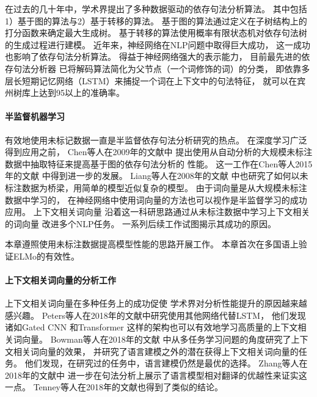 在过去的几十年中，学术界提出了多种数据驱动的依存句法分析算法。
其中包括1）基于图的算法\cite{mcdonald2006online}与2）基于转移的算法\cite{nivre2008algorithms,dyer-EtAl:2015:ACL-IJCNLP,zhang-nivre:2011:ACL-HLT2011}。
基于图的算法通过定义在子树结构上的打分函数来确定最大生成树。
基于转移的算法使用概率有限状态机对依存句法树的生成过程进行建模。
近年来，神经网络在NLP问题中取得巨大成功，
这一成功也影响了依存句法分析算法。
得益于神经网络强大的表示能力，
目前最先进的依存句法分析器\cite{DBLP:journals/corr/DozatM16,dozat-qi-manning:2017:K17-3}
已将解码算法简化为父节点（一个词修饰的词）的分类，
即依靠多层长短期记忆网络（LSTM）来捕捉一个词在上下文中的句法特征，
就可以在宾州树库上达到95以上的准确率。

\paragraph{半监督机器学习}
有效地使用未标记数据一直是半监督依存句法分析研究的热点。
在深度学习广泛得到应用之前，
Chen等人在2009年的文献中
提出使用从自动分析的大规模未标注数据中抽取特征来提高基于图的依存句法分析的
性能。
这一工作在Chen等人2015年的文献
中得到进一步的发展。
Liang等人在2008年的文献
中也研究了如何以未标注数据为桥梁，用简单的模型近似复杂的模型。
由于词向量是从大规模未标注数据中学习的，
在神经网络中使用词向量的方法也可以视作是半监督学习的成功应用。
上下文相关词向量\cite{peters-EtAl:2018:N18-1,DBLP:journals/corr/abs-1810-04805}
沿着这一科研思路通过从未标注数据中学习上下文相关的词向量
改进多个NLP任务。 
一系列后续工作\cite{P18-1031,joshi-peters-hopkins:2018:Long,peters-EtAl:2018:EMNLP}试图揭示其成功的原因。

本章遵照使用未标注数据提高模型性能的思路开展工作。
本章首次在多国语上验证ELMo的有效性。

\paragraph{上下文相关词向量的分析工作}
上下文相关词向量在多种任务上的成功促使
学术界对分析性能提升的原因越来越感兴趣。 
Peters等人在2018年的文献中研究使用其他网络代替LSTM，
他们发现诸如Gated CNN \cite{pmlr-v70-dauphin17a}
和Transformer \cite{NIPS2017_7181}
这样的架构也可以有效地学习高质量的上下文相关词向量。
Bowman等人在2018年的文献
中从多任务学习问题的角度研究了上下文相关词向量的效果，
并研究了语言建模之外的潜在获得上下文相关词向量的任务。
他们发现，在研究过的任务中，语言建模仍然是最优的选择。 
Zhang等人在2018年的文献中
进一步在句法分析上展示了语言模型相对翻译的优越性来证实这一点。 
Tenney等人在2018年的文献也得到了类似的结论。

